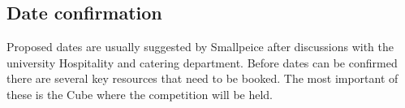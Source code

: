 
\subsection{Date confirmation}

Proposed dates are usually suggested by Smallpeice after discussions with the university Hospitality and catering department.
Before dates can be confirmed there are several key resources that need to be booked.
The most important of these is the Cube where the competition will be held.

